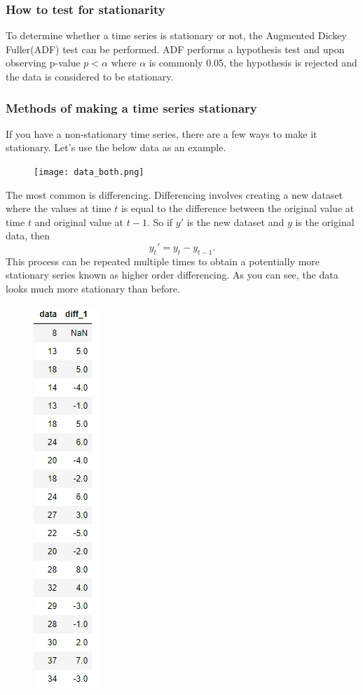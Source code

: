 \documentclass{article}
\begin{document}
  \begin{flushleft}
  \subsubsection{How to test for stationarity}
    To determine whether a time series is stationary or not, the Augmented Dickey Fuller(ADF) test can be performed. ADF performs a hypothesis test and upon observing p-value $p < \alpha$ where $\alpha$ is commonly 0.05, the hypothesis is rejected and the data is considered to be stationary.

  \subsubsection{Methods of making a time series stationary}
    If you have a non-stationary time series, there are a few ways to make it stationary. Let's use the below data as an example.
    \begin{figure}[H]
      \texttt{[image: data\_both.png]}
    \end{figure}
    \newpage
    The most common is differencing. Differencing involves creating a new dataset where the values at time $t$ is equal to the difference between the original value at time $t$ and original value at $t-1$. So if $y'$ is the new dataset and $y$ is the original data, then
    \begin{equation*}
      y_t'=y_t-y_{t-1}.
    \end{equation*}
    This process can be repeated multiple times to obtain a potentially more stationary series known as higher order differencing. As you can see, the data looks much more stationary than before.
    \begin{figure}[H]
      \centering
      \includegraphics[scale=0.6]{diff_numbers.png}

\end{figure}
\end{flushleft}
\end{document}
